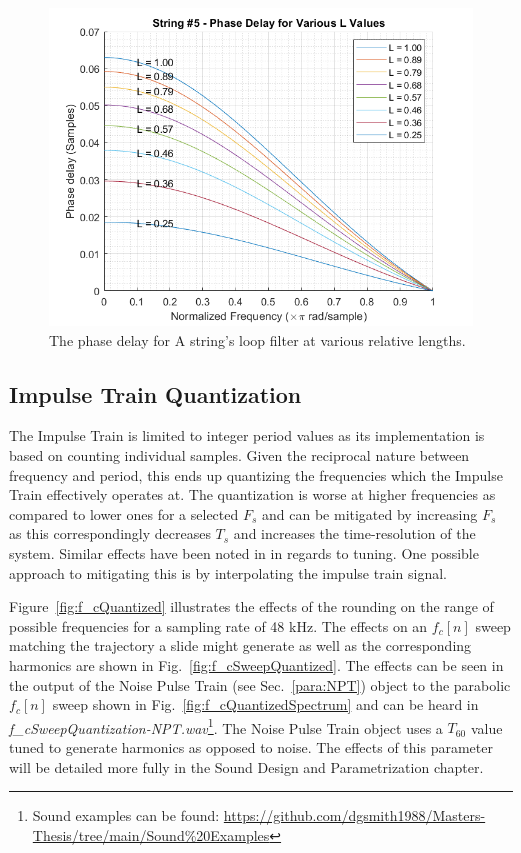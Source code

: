 \documentclass[../main.tex]{subfiles}
\begin{document}
\begin{figure}[h]
    \centering
    \includegraphics[scale=.65]{./images/plots/String 5 - Phase Delays.png}
    \caption{The phase delay for A string's loop filter at various relative lengths.}
    \label{fig:Str5PhaseDelays}
\end{figure}

\subsection{Impulse Train Quantization}
The Impulse Train is limited to integer period values as its implementation is based on counting individual samples. Given the reciprocal nature between frequency and period, this ends up quantizing the frequencies which the Impulse Train effectively operates at. The quantization is worse at higher frequencies as compared to lower ones for a selected $F_s$ and can be mitigated by increasing $F_s$ as this correspondingly decreases $T_s$ and increases the time-resolution of the system. Similar effects have been noted in  in regards to tuning. One possible approach to mitigating this is by interpolating the impulse train signal.

Figure~\ref{fig:f_cQuantized} illustrates the effects of the rounding on the range of possible frequencies for a sampling rate of 48 kHz. The effects on an $f_c[n]$ sweep matching the trajectory a slide might generate as well as the corresponding harmonics are shown in Fig.~\ref{fig:f_cSweepQuantized}. The effects can be seen in the output of the Noise Pulse Train (see Sec.~\ref{para:NPT}) object to the parabolic $f_c[n]$ sweep shown in Fig.~\ref{fig:f_cQuantizedSpectrum} and can be heard in \emph{f\_cSweepQuantization-NPT.wav}\footnote{Sound examples can be found: \url{https://github.com/dgsmith1988/Masters-Thesis/tree/main/Sound\%20Examples}}. The Noise Pulse Train object uses a $T_{60}$ value tuned to generate harmonics as opposed to noise. The effects of this parameter will be detailed more fully in the Sound Design and Parametrization chapter.
\end{document}
